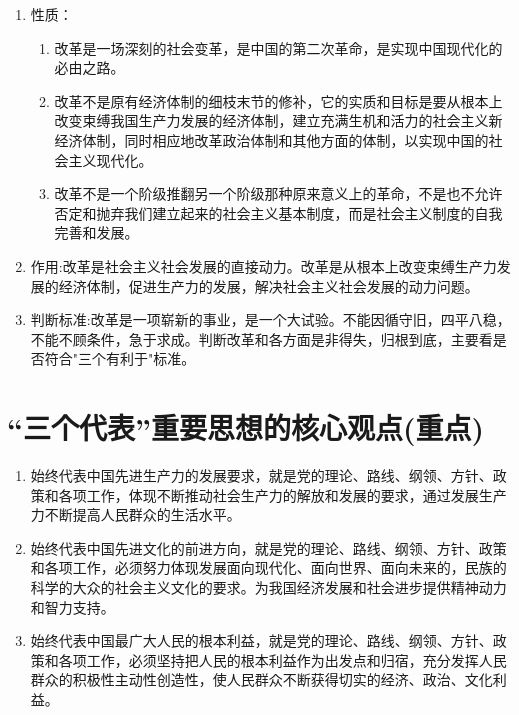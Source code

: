 \documentclass[12pt, a4paper, oneside]{ctexbook}
\begin{document}
\begin{enumerate}
\item 性质：
\begin{enumerate}[label=(\arabic*)]
\item 改革是一场深刻的社会变革，是中国的第二次革命，是实现中国现代化的必由之路。

\item 改革不是原有经济体制的细枝末节的修补，它的实质和目标是要从根本上改变束缚我国生产力发展的经济体制，建立充满生机和活力的社会主义新经济体制，同时相应地改革政治体制和其他方面的体制，以实现中国的社会主义现代化。

\item 改革不是一个阶级推翻另一个阶级那种原来意义上的革命，不是也不允许否定和抛弃我们建立起来的社会主义基本制度，而是社会主义制度的自我完善和发展。
\end{enumerate}

\item 作用:改革是社会主义社会发展的直接动力。改革是从根本上改变束缚生产力发展的经济体制，促进生产力的发展，解决社会主义社会发展的动力问题。

\item 判断标准:改革是一项崭新的事业，是一个大试验。不能因循守旧，四平八稳，不能不顾条件，急于求成。判断改革和各方面是非得失，归根到底，主要看是否符合"三个有利于"标准。
\end{enumerate}

\section{“三个代表”重要思想的核心观点(重点)}

\begin{enumerate}
\item 始终代表中国先进生产力的发展要求，就是党的理论、路线、纲领、方针、政策和各项工作，体现不断推动社会生产力的解放和发展的要求，通过发展生产力不断提高人民群众的生活水平。

\item 始终代表中国先进文化的前进方向，就是党的理论、路线、纲领、方针、政策和各项工作，必须努力体现发展面向现代化、面向世界、面向未来的，民族的科学的大众的社会主义文化的要求。为我国经济发展和社会进步提供精神动力和智力支持。

\item 始终代表中国最广大人民的根本利益，就是党的理论、路线、纲领、方针、政策和各项工作，必须坚持把人民的根本利益作为出发点和归宿，充分发挥人民群众的积极性主动性创造性，使人民群众不断获得切实的经济、政治、文化利益。
\end{enumerate}
\end{document}
